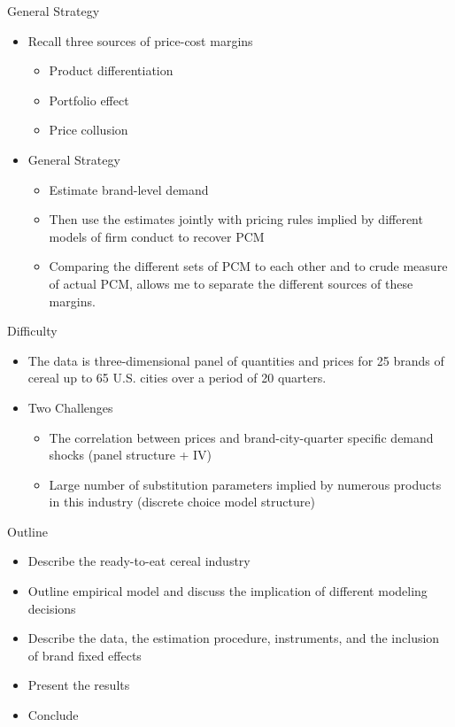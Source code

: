 \documentclass{beamer}
\begin{document}
\begin{frame}{General Strategy}
	\begin{itemize}
		\item Recall three sources of price-cost margins
		\begin{itemize}
			\item Product differentiation
			\item Portfolio effect
			\item Price collusion
		\end{itemize}
		\item General Strategy
		\begin{itemize}
			\item Estimate brand-level demand
			\item Then use the estimates jointly with pricing rules implied by different models of firm conduct to recover PCM
			\item Comparing the different sets of PCM to each other and to crude measure of actual PCM, allows me to separate the different sources of these margins.
		\end{itemize}
	\end{itemize}
\end{frame}
\begin{frame}{Difficulty}
	\begin{itemize}
		\item The data is three-dimensional panel of quantities and prices for 25 brands of cereal up to 65 U.S. cities over a period of 20 quarters.
		\item Two Challenges
		\begin{itemize}
			\item The correlation between prices and brand-city-quarter specific demand shocks (panel structure + IV)
			\item Large number of substitution parameters implied by numerous products in this industry (discrete choice model structure)
		\end{itemize}
	\end{itemize}
\end{frame}
\begin{frame}{Outline}
	\begin{itemize}
		\item Describe the ready-to-eat cereal industry
		\item Outline empirical model and discuss the implication of different modeling decisions
		\item Describe the data, the estimation procedure, instruments, and the inclusion of brand fixed effects
		\item Present the results
		\item Conclude
	\end{itemize}
\end{frame}
\end{document}

